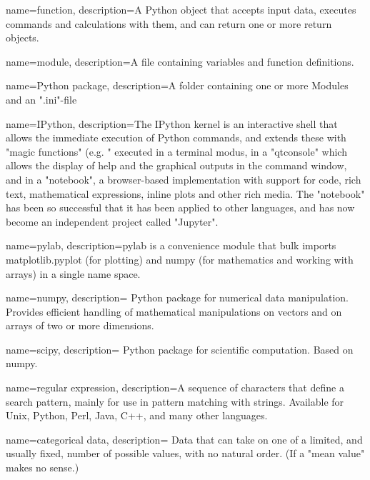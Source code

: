 \makeglossaries

{
    name=function,
    description={A Python object that accepts input data, executes commands and
    calculations with them, and can return one or more return objects.}
}

{
    name=module,
    description={A file containing variables and function definitions.}
}

{
    name=Python package,
    description={A folder containing one or more Modules and an ".ini"-file}
}

{
    name=IPython,
    description={The IPython kernel is an interactive shell that allows the immediate
    execution of Python commands, and extends these with "magic functions"
    (e.g. "%
    executed in a terminal modus, in a "qtconsole" which allows the display of
    help and the graphical outputs in the command window, and in a "notebook",
    a browser-based implementation with support for code, rich text,
    mathematical expressions, inline plots and other rich media. The
    "notebook" has been so successful that it has been applied to other
    languages, and has now become an independent project called "Jupyter".}
}

{
    name=pylab,
    description={pylab is a convenience module that bulk imports matplotlib.pyplot (for
    plotting) and numpy (for mathematics and working with arrays) in a single
    name space.}
}

{
    name=numpy,
    description={ Python package for numerical data manipulation. Provides efficient
    handling of mathematical manipulations on vectors and on arrays of two or
    more dimensions.}
}

{
    name=scipy,
    description={ Python package for scientific computation. Based on numpy.}
}

{
    name=regular expression,
    description={A sequence of characters that define a search pattern, mainly for use in
    pattern matching with strings. Available for Unix, Python, Perl, Java, C++, and many other
    languages.}
}

{
    name=categorical data,
    description={ Data that can take on one of a limited, and usually fixed, number of
    possible values, with no natural order. (If a "mean value" makes no
    sense.)}
}

